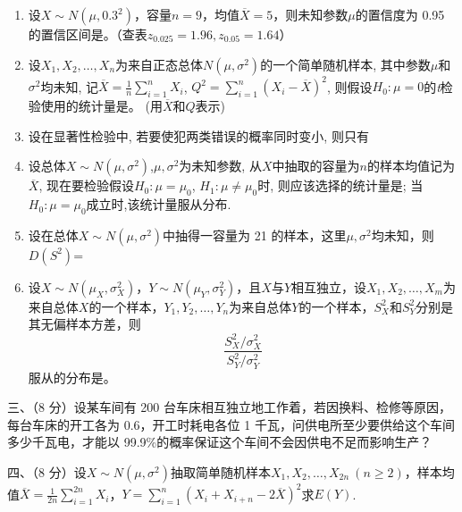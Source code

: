 \documentclass[fontset=exam]{exam-zh}
\begin{document}
\begin{enumerate}
\def\labelenumi{\arabic{enumi}.}
\item
  设\(X\sim N(\mu,0.3^2)\)，容量\(n=9\)，均值\(\overline X=5\)，则未知参数\(\mu\)的置信度为 0.95 的置信区间是\underline{\hspace{2cm}}。（查表\(z_{0.025}=1.96,z_{0.05}=1.64\)）
\item
  设\(X_1,X_2,\ldots,X_n\)为来自正态总体\(N(\mu,\sigma^2)\)的一个简单随机样本, 其中参数\(\mu\)和\(\sigma^2\)均未知, 记\(\overline X=\frac1n\sum_{i=1}^nX_i\), \(Q^2=\sum_{i=1}^n(X_i-\overline X)^2\), 则假设\(H_0:\mu=0\)的\emph{t}检验使用的统计量是\underline{\hspace{2cm}}。 (用\(\overline X\)和\(Q\)表示)
\item
  设在显著性检验中, 若要使犯两类错误的概率同时变小, 则只有\underline{\hspace{2cm}}
\item
  设总体\(X\sim N(\mu,\sigma^2)\),\(\mu,\sigma^2\)为未知参数, 从\(X\)中抽取的容量为\(n\)的样本均值记为\(\overline X\), 现在要检验假设\(H_0:\mu=\mu_0\), \(H_1:\mu\ne\mu_0\)时, 则应该选择的统计量是\underline{\hspace{2cm}}; 当\(H_0:\mu=\mu_0\)成立时,该统计量服从\underline{\hspace{2cm}}分布.
\item
  设在总体\(X\sim N(\mu,\sigma^2)\)中抽得一容量为 21 的样本，这里\(\mu,\sigma^2\)均未知，则\(D(S^2)\)=\underline{\hspace{2cm}}
\item
  设\(X\sim N(\mu_X,\sigma_X^2)\)，\(Y\sim N(\mu_Y,\sigma_Y^2)\)，且\(X\)与\(Y\)相互独立，设\(X_1,X_2,\ldots,X_m\)为来自总体\(X\)的一个样本，\(Y_1,Y_2,\ldots,Y_n\)为来自总体\(Y\)的一个样本，\(S_X^2\)和\(S_Y^2\)分别是其无偏样本方差，则\[\frac{S_X^2/\sigma_X^2}{S_Y^2/\sigma_Y^2}\]服从的分布是\underline{\hspace{2cm}}。
\end{enumerate}


三、（8 分）设某车间有 200 台车床相互独立地工作着，若因换料、检修等原因，每台车床的开工各为 0.6，开工时耗电各位 1 千瓦，问供电所至少要供给这个车间多少千瓦电，才能以 99.9\%的概率保证这个车间不会因供电不足而影响生产？


四、（8 分）设\(X\sim N(\mu,\sigma^2)\)抽取简单随机样本\(X_1,X_2,\ldots,X_{2n}\ (n\geq2)\)，样本均值\(\overline X=\frac1{2n}\sum_{i=1}^{2n}X_i\)，\(Y=\sum_{i=1}^n(X_i+X_{i+n}-2\overline X)^2\)求\(E(Y)\).
\end{document}
